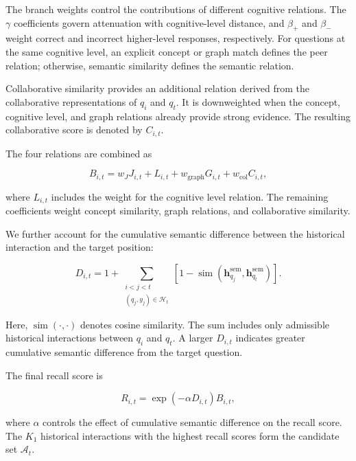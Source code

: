 \documentclass{llncs}
\begin{document}
The branch weights control the contributions of different cognitive relations. The $\gamma$ coefficients govern attenuation with cognitive-level distance, and $\beta_+$ and $\beta_-$ weight correct and incorrect higher-level responses, respectively. For questions at the same cognitive level, an explicit concept or graph match defines the peer relation; otherwise, semantic similarity defines the semantic relation.

Collaborative similarity provides an additional relation derived from the collaborative representations of \(q_i\) and \(q_t\). It is downweighted when the concept, cognitive level, and graph relations already provide strong evidence. The resulting collaborative score is denoted by \(C_{i,t}\).

The four relations are combined as

\begin{equation}
B_{i,t}=w_JJ_{i,t}+L_{i,t}+w_{\mathrm{graph}}G_{i,t}+w_{\mathrm{col}}C_{i,t},
\end{equation}

where \(L_{i,t}\) includes the weight for the cognitive level relation. The remaining coefficients weight concept similarity, graph relations, and collaborative similarity.

We further account for the cumulative semantic difference between the historical interaction and the target position:

\begin{equation}
D_{i,t}=1+\sum_{\substack{i<j<t\\(q_j,y_j)\in\mathcal H_t}}
\left[1-\operatorname{sim}\left(\mathbf h_{q_j}^{\mathrm{sem}},\mathbf h_{q_t}^{\mathrm{sem}}\right)\right].
\end{equation}

Here, $\operatorname{sim}(\cdot,\cdot)$ denotes cosine similarity. The sum includes only admissible historical interactions between $q_i$ and $q_t$. A larger $D_{i,t}$ indicates greater cumulative semantic difference from the target question.

The final recall score is

\begin{equation}
R_{i,t}=\exp\left(-\alpha D_{i,t}\right)B_{i,t},
\end{equation}

where \(\alpha\) controls the effect of cumulative semantic difference on the recall score. The \(K_1\) historical interactions with the highest recall scores form the candidate set \(\mathcal{A}_t\).
\end{document}
